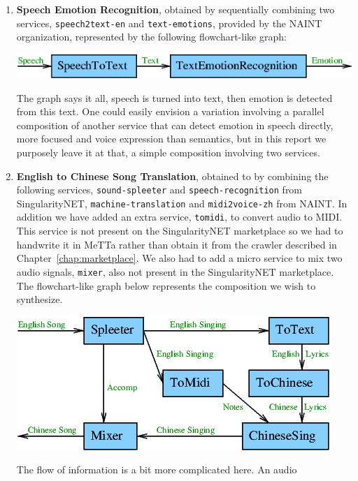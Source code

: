 \documentclass[]{report}
\begin{document}
\begin{enumerate}
\item \textbf{Speech Emotion Recognition}, obtained by sequentially
  combining two services, \texttt{speech2text-en} and
  \texttt{text-emotions}, provided by the NAINT organization,
  represented by the following flowchart-like graph:
  \begin{center}
    \includegraphics[scale=0.55]{figs/SimpleSpeechEmotionRecognition.png}
  \end{center}
  The graph says it all, speech is turned into text, then emotion is
  detected from this text.  One could easily envision a variation
  involving a parallel composition of another service that can detect
  emotion in speech directly, more focused and voice expression than
  semantics, but in this report we purposely leave it at that, a
  simple composition involving two services.
\item \textbf{English to Chinese Song Translation}, obtained to by
  combining the following services, \texttt{sound-spleeter} and
  \texttt{speech-recognition} from SingularityNET,
  \texttt{machine-translation} and \texttt{midi2voice-zh} from NAINT.
  In addition we have added an extra service, \texttt{tomidi}, to
  convert audio to MIDI.  This service is not present on the
  SingularityNET marketplace so we had to handwrite it in MeTTa rather
  than obtain it from the crawler described in
  Chapter~\ref{chap:marketplace}.  We also had to add a micro service
  to mix two audio signals, \texttt{mixer}, also not present in the
  SingularityNET marketplace.  The flowchart-like graph below
  represents the composition we wish to synthesize.
  \begin{center}
    \includegraphics[scale=0.6]{figs/EnglishToChineseSong.png}
  \end{center}
  The flow of information is a bit more complicated here.  An audio

\end{enumerate}
\end{document}
